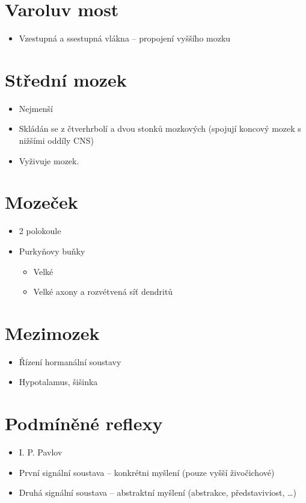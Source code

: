 \documentclass[a4]{article}
\begin{document}
\section{Varoluv most}
\begin{itemize}
	\item Vzestupná a ssestupná vlákna -- propojení vyššího mozku
\end{itemize}
\section{Střední mozek}
\begin{itemize}
	\item Nejmenší
	\item Skládán se z čtverhrbolí a dvou stonků mozkových (spojují koncový mozek s nižšími oddíly CNS)
	\item Vyživuje mozek.
\end{itemize}
\section{Mozeček}
\begin{itemize}
	\item 2 polokoule
	\item Purkyňovy buňky
		\begin{itemize}
			\item Velké
			\item Velké axony a rozvétvená síť dendritů
		\end{itemize}
\end{itemize}
\section{Mezimozek}
\begin{itemize}
	\item Řízení hormanální soustavy
	\item Hypotalamus, šišinka
\end{itemize}

\section{Podmíněné reflexy}
\begin{itemize}
	\item I. P. Pavlov
	\item První signální soustava -- konkrétni myšlení (pouze vyšší živočichové)
	\item Druhá signální soustava -- abstraktní myšlení (abstrakce, představiviost, \dots)
\end{itemize}
\end{document}
